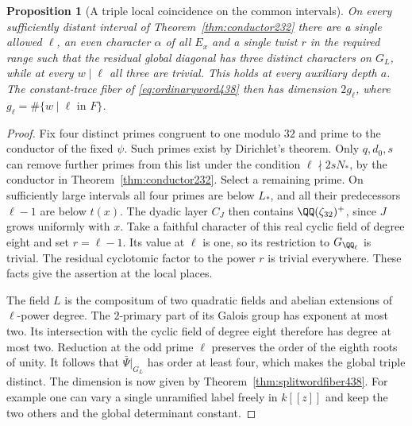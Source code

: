 \documentclass[a4paper,11pt]{article}
\newtheorem{proposition}{Proposition}[section]
\theoremstyle{definition}
\theoremstyle{remark}
\numberwithin{equation}{section}
\begin{document}
\begin{proposition}[A triple local coincidence on the common intervals]\leavevmode
\label{prop:dyadiccollision438}
On every sufficiently distant interval of
Theorem~\ref{thm:conductor232} there are a single allowed
\(\ell\), an even character \(\alpha\) of all \(E_x\) and
a single twist \(r\) in the required range such that the
residual global diagonal has three distinct characters on
\(G_L\), while at every \(w\mid\ell\) all three are trivial.
This holds at every auxiliary depth \(a\). The constant-trace
fiber of \eqref{eq:ordinaryword438} then has dimension
\(2g_\ell\), where \(g_\ell=\#\{w\mid\ell\text{ in }F\}\).
\end{proposition}
\begin{proof}
Fix four distinct primes congruent to one modulo \(32\)
and prime to the conductor of the fixed \(\psi\). Such primes
exist by Dirichlet's theorem. Only \(q,d_0,s\) can remove
further primes from this list under the condition
\(\ell\nmid 2sN_*\), by the conductor in
Theorem~\ref{thm:conductor232}. Select a remaining prime.
On sufficiently large intervals all four primes are below
\(L_*\), and all their predecessors \(\ell-1\) are below
\(t(x)\). The dyadic layer \(C_J\) then contains
\(\QQ(\zeta_{32})^+\), since \(J\) grows uniformly with \(x\).
Take a faithful character of this real cyclic field of
degree eight and set \(r=\ell-1\). Its value at \(\ell\)
is one, so its restriction to \(G_{\QQ_\ell}\) is trivial.
The residual cyclotomic factor to the power \(r\) is trivial
everywhere. These facts give the assertion at the local places.

The field \(L\) is the compositum of two quadratic fields
and abelian extensions of \(\ell\)-power degree. The
\(2\)-primary part of its Galois group has exponent at most
two. Its intersection with the cyclic field of degree eight
therefore has degree at most two. Reduction at the odd prime
\(\ell\) preserves the order of the eighth roots of unity.
It follows that \(\bar\Psi|_{G_L}\) has order at least four,
which makes the global triple distinct. The dimension is now
given by Theorem~\ref{thm:splitwordfiber438}. For example
one can vary a single unramified label freely in \(k[[z]]\)
and keep the two others and the global determinant constant.
\end{proof}
\end{document}

